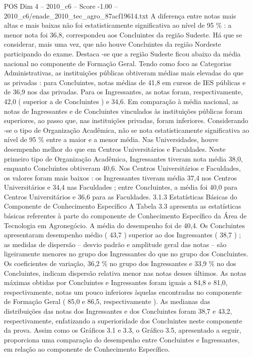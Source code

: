 \begin{textsample}{POS Dim 4 – 2010\_c6 – Score -1.00 – 2010\_c6/enade\_2010\_tec\_agro\_87acf19614.txt}
A diferença entre notas mais altas e mais baixas não foi estatisticamente significativa ao nível de 95 \% : a menor nota foi 36,8, correspondeu aos Concluintes da região Sudeste.
Há que se considerar, mais uma vez, que não houve Concluintes da região Nordeste participando do exame.
Destaca -se que a região Sudeste ficou abaixo da média nacional no componente de Formação Geral.
Tendo como foco as Categorias Administrativas, as instituições públicas obtiveram médias mais elevadas do que as privadas : para Concluintes, notas médias de 41,8 em cursos de IES públicas e de 36,9 nos das privadas.
Para os Ingressantes, as notas foram, respectivamente, 42,0 ( superior a de Concluintes ) e 34,6.
Em comparação à média nacional, as notas de Ingressantes e de Concluintes vinculados às instituições públicas foram superiores, ao passo que, nas instituições privadas, foram inferiores.
Considerando -se o tipo de Organização Acadêmica, não se nota estatisticamente significativa ao nível de 95 \% entre a maior e a menor média.
Nas Universidades, houve desempenho melhor do que em Centros Universitários e Faculdades.
Neste primeiro tipo de Organização Acadêmica, Ingressantes tiveram nota média 38,0, enquanto Concluintes obtiveram 40,6.
Nos Centros Universitários e Faculdades, os valores foram mais baixos : os Ingressantes tiveram média 37,4 nos Centros Universitários e 34,4 nas Faculdades ; entre Concluintes, a média foi 40,0 para Centros Universitários e 36,6 para as Faculdades. 3.1.3 Estatísticas Básicas do Componente de Conhecimento Específico A Tabela 3.3 apresenta as estatísticas básicas referentes à parte do componente de Conhecimento Específico da Área de Tecnologia em Agronegócio.
A média do desempenho foi de 40,4.
Os Concluintes apresentaram desempenho médio ( 43,7 ) superior ao dos Ingressantes ( 38,7 ) ; as medidas de dispersão – desvio padrão e amplitude geral das notas – são ligeiramente menores no grupo dos Ingressantes do que no grupo dos Concluintes.
Os coeficientes de variação, 36,2 \% no grupo dos Ingressantes e 33,9 \% no dos Concluintes, indicam dispersão relativa menor nas notas desses últimos.
As notas máximas obtidas por Concluintes e Ingressantes foram iguais a 84,8 e 81,0, respectivamente, notas um pouco inferiores àquelas encontradas no componente de Formação Geral ( 85,0 e 86,5, respectivamente ).
As medianas das distribuições das notas dos Ingressantes e dos Concluintes foram 38,7 e 43,2, respectivamente, enfatizando a superioridade dos Concluintes neste componente da prova.
Assim como os Gráficos 3.1 e 3.3, o Gráfico 3.5, apresentado a seguir, proporciona uma comparação do desempenho entre Concluintes e Ingressantes, em relação ao componente de Conhecimento Específico.

\end{textsample}
